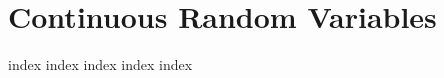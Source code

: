 \chapter{Continuous Random Variables}
\label{ch:cp}
\ifdefined\HCode
\else
{
\startcontents[chapter]
}
\fi

{index}
{index}
{index}
{index}
{index}

\ifdefined\HCode
{}
\fi

\ifdefined\HCode
\else
{
\stopcontents[chapter]
}
\fi

\ifdefined\HCode
{}
\fi
